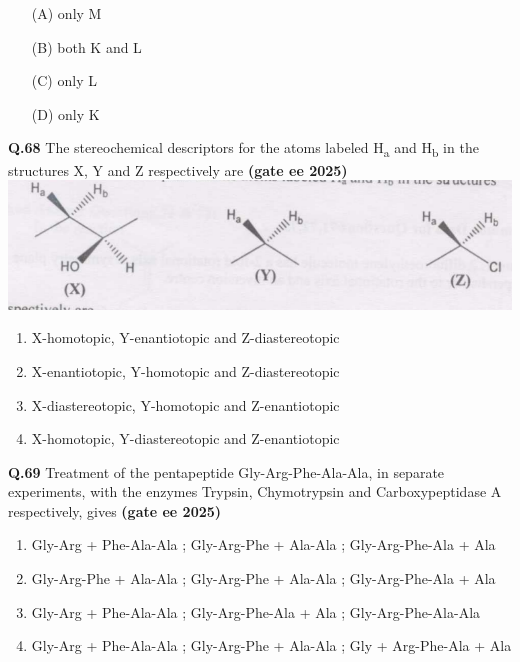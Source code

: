 \documentclass[journal,12pt,onecolumn]{exam}
\theoremstyle{remark}
\begin{document}
\begin{multicols}{2}
\begin{itemize}
  \item[(A)] only M
  \item[(B)] both K and L
  \item[(C)] only L
  \item[(D)] only K
\end{itemize}
\end{multicols}

\vspace{1cm}

\noindent \textbf{Q.68} The stereochemical descriptors for the atoms labeled H\textsubscript{a} and H\textsubscript{b} in the structures X, Y and Z respectively are \hfill{\textbf{(gate ee 2025)}}
\includegraphics[scale=1]{images/image10.png}
\begin{multicols}{2}
\begin{enumerate}[label=(\Alph*)]
\item X-homotopic, Y-enantiotopic and Z-diastereotopic
\item X-enantiotopic, Y-homotopic and Z-diastereotopic
\item X-diastereotopic, Y-homotopic and Z-enantiotopic
\item X-homotopic, Y-diastereotopic and Z-enantiotopic
\end{enumerate}
\end{multicols}
\vspace{1cm}

\noindent \textbf{Q.69} Treatment of the pentapeptide Gly-Arg-Phe-Ala-Ala, in separate experiments, with the enzymes Trypsin, Chymotrypsin and Carboxypeptidase A respectively, gives \hfill{\textbf{(gate ee 2025)}}

\begin{multicols}{2}
\begin{enumerate}[label=(\Alph*)]
\item Gly-Arg + Phe-Ala-Ala ; Gly-Arg-Phe + Ala-Ala ; Gly-Arg-Phe-Ala + Ala
\item Gly-Arg-Phe + Ala-Ala ; Gly-Arg-Phe + Ala-Ala ; Gly-Arg-Phe-Ala + Ala
\item Gly-Arg + Phe-Ala-Ala ; Gly-Arg-Phe-Ala + Ala ; Gly-Arg-Phe-Ala-Ala
\item Gly-Arg + Phe-Ala-Ala ; Gly-Arg-Phe + Ala-Ala ; Gly + Arg-Phe-Ala + Ala
\end{enumerate}
\end{multicols}
\vspace{2cm}
\end{document}
